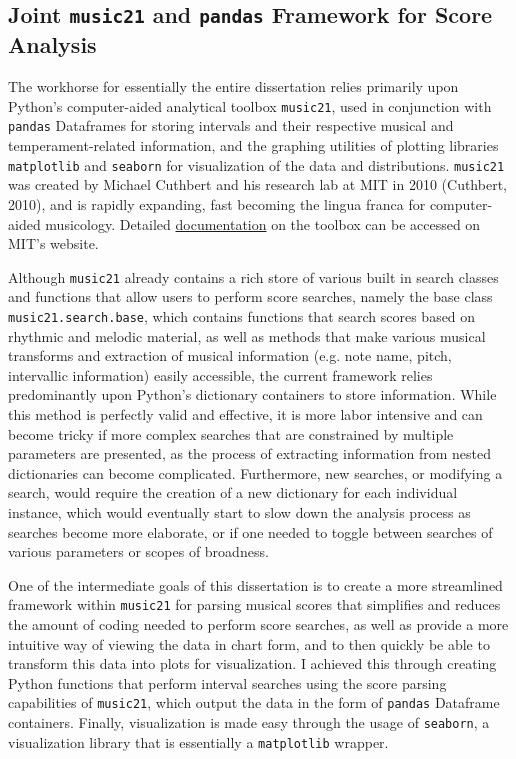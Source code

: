     \subsection{\texorpdfstring{Joint \texttt{music21} and \texttt{pandas}
Framework for Score
Analysis}{Joint music21 and pandas Framework for Score Analysis}}\label{joint-music21-and-pandas-framework-for-score-analysis}

The workhorse for essentially the entire dissertation relies primarily
upon Python's computer-aided analytical toolbox \texttt{music21}, used
in conjunction with \texttt{pandas} Dataframes for storing intervals and
their respective musical and temperament-related information, and the
graphing utilities of plotting libraries \texttt{matplotlib} and
\texttt{seaborn} for visualization of the data and distributions.
\texttt{music21} was created by Michael Cuthbert and his research lab at
MIT in 2010 (Cuthbert, 2010), and is rapidly expanding, fast becoming
the lingua franca for computer-aided musicology. Detailed
\href{https://web.mit.edu/music21/}{documentation} on the toolbox can be
accessed on MIT's website.

Although \texttt{music21} already contains a rich store of various built
in search classes and functions that allow users to perform score
searches, namely the base class \texttt{music21.search.base}, which
contains functions that search scores based on rhythmic and melodic
material, as well as methods that make various musical transforms and
extraction of musical information (e.g. note name, pitch, intervallic
information) easily accessible, the current framework relies
predominantly upon Python's dictionary containers to store information.
While this method is perfectly valid and effective, it is more labor
intensive and can become tricky if more complex searches that are
constrained by multiple parameters are presented, as the process of
extracting information from nested dictionaries can become complicated.
Furthermore, new searches, or modifying a search, would require the
creation of a new dictionary for each individual instance, which would
eventually start to slow down the analysis process as searches become
more elaborate, or if one needed to toggle between searches of various
parameters or scopes of broadness.

One of the intermediate goals of this dissertation is to create a more
streamlined framework within \texttt{music21} for parsing musical scores
that simplifies and reduces the amount of coding needed to perform score
searches, as well as provide a more intuitive way of viewing the data in
chart form, and to then quickly be able to transform this data into
plots for visualization. I achieved this through creating Python
functions that perform interval searches using the score parsing
capabilities of \texttt{music21}, which output the data in the form of
\texttt{pandas} Dataframe containers. Finally, visualization is made
easy through the usage of \texttt{seaborn}, a visualization library that
is essentially a \texttt{matplotlib} wrapper.


